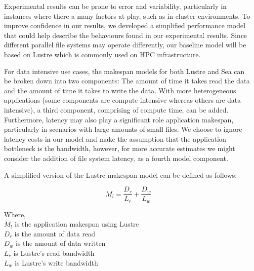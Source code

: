      Experimental results can be prone to error and variability, particularly in instances
      where there a many factors at play, such as in cluster environments. To improve
      confidence in our results, we developed a simplified performance model that
      could help describe the behaviours found in our experimental results. Since different
      parallel file systems may operate differently, our baseline model will be
      based on Lustre which is commonly used on HPC infrastructure.

      For data intensive use cases, the makespan models for both Lustre and Sea
      can be broken down into two components: The amount of time it takes read
      the data and the amount of time it takes to write the data. With more
      heterogeneous applications (some components are compute intensive whereas
      others are data intensive), a third component, comprising of compute time,
      can be added. Furthermore, latency may also play a significant role
      application makespan, particularly in scenarios with large amounts of
      small files. We choose to ignore latency costs in our model and make the
      assumption that the application bottleneck is the bandwidth, however, for
      more accurate estimates we might consider the addition of file system
      latency, as a fourth model component.

      A simplified version of the Lustre makespan model can be defined as
      follows:

      \begin{equation}\label{eq:sea-comp:lustrenpc}
          M_{l} =  \frac{D_{r}}{L_{r}} + \frac{D_{w}}{L_{w}}
      \end{equation}

      Where, \\
      $M_{l}$ is the application makespan using Lustre \\
      $D_{r}$ is the amount of data read \\
      $D_{w}$ is the amount of data written \\
      $L_{r}$ is Lustre's read bandwidth \\
      $L_{w}$ is Lustre's write bandwidth \\


